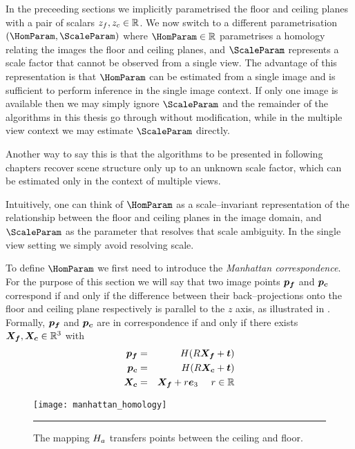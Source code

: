 In the preceeding sections we implicitly parametrised the floor and
ceiling planes with a pair of scalars $\zfloor,\zceil\in\Reals$. We
now switch to a different parametrisation $(\HomParam,\ScaleParam)$
where $\HomParam\in\Reals$ parametrises a homology relating the images
the floor and ceiling planes, and $\ScaleParam$ represents a scale
factor that cannot be observed from a single view. The advantage of
this representation is that $\HomParam$ can be estimated from a single
image and is sufficient to perform inference in the single image
context. If only one image is available then we may simply ignore
$\ScaleParam$ and the remainder of the algorithms in this thesis go
through without modification, while in the multiple view context we
may estimate $\ScaleParam$ directly.

Another way to say this is that the algorithms to be presented in
following chapters recover scene structure only up to an unknown scale
factor, which can be estimated only in the context of multiple views.

Intuitively, one can think of $\HomParam$ as a scale--invariant
representation of the relationship between the floor and ceiling
planes in the image domain, and $\ScaleParam$ as the parameter that
resolves that scale ambiguity. In the single view setting we simply
avoid resolving scale.

To define $\HomParam$ we first need to introduce the \textit{Manhattan
  correspondence}. For the purpose of this section we will say that
two image points $\FloorPt$ and $\CeilPt$ correspond if and only if
the difference between their back--projections onto the floor and
ceiling plane respectively is parallel to the $z$ axis, as illustrated
in . Formally, $\FloorPt$ and $\CeilPt$ are in
correspondence if and only if there exists $\FloorVec,\CeilVec \in
\Rthree$ with
\begin{eqnarray}
  \FloorPt &=& \CamMatrix (\CamR \FloorVec + \CamTr) \\
  \CeilPt &=& \CamMatrix (\CamR \CeilVec + \CamTr) \\
  \CeilVec &=& \FloorVec + r \ez ~~~~ r \in \Reals
\end{eqnarray}

\begin{figure}[tb]
  \label{fig:homology}
  \centering
  \texttt{[image: manhattan\_homology]}
  \caption{The mapping $\Hcf$ transfers points between the ceiling
    and floor.}
  \hrule
\end{figure}

